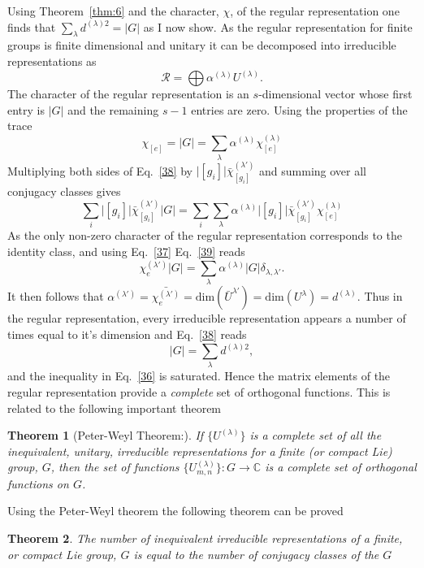 \documentclass{article}
\newcommand\defn[1]{\textsl{#1}}
\newcommand\cR{{\mathcal R}}
\newtheorem{theorem}{Theorem}
\begin{document}
Using Theorem~\ref{thm:6} and the character, $\chi$, of the regular representation one finds that $\sum_\lambda d^{(\lambda)2}=\lvert G\rvert$ as I now show.  As the regular representation for finite groups is finite dimensional and unitary it can be decomposed into irreducible representations as 
\begin{equation}
\cR=\bigoplus \alpha^{(\lambda)} U^{(\lambda)}.
\label{37}
\end{equation}
The character of the regular representation is an $s$-dimensional vector whose first entry is $\lvert G\rvert$ and the remaining $s-1$ entries are zero.  Using the properties of the trace 
\begin{equation}
\chi_{[e]}=\lvert G\rvert=\sum_\lambda \alpha^{(\lambda)} \chi^{(\lambda)}_{[e]}
\label{38}
\end{equation}
Multiplying both sides of Eq.~\eqref{38} by $\lvert[g_i]\rvert\bar{\chi}^{(\lambda')}_{[g_i]}$ and summing over all conjugacy classes  gives
\begin{equation}
\sum_i\lvert[g_i]\rvert\bar{\chi}^{(\lambda')}_{[g_i]}\lvert G\rvert=\sum_i\sum_\lambda\alpha^{(\lambda)}\rvert[g_i]\lvert\bar{\chi}^{(\lambda')}_{[g_i]}\chi^{(\lambda)}_{[e]}
\label{39}
\end{equation}
As the only non-zero character of the regular representation corresponds to the identity class, and using Eq.~\eqref{37} Eq.~\eqref{39} reads
\begin{equation}
{\chi}^{(\lambda')}_{e}\lvert G\rvert=\sum_\lambda\alpha^{(\lambda)}\lvert G\rvert\delta_{\lambda,\lambda'}.
\label{40}
\end{equation}
It then follows that $\alpha^{(\lambda')}=\bar{\chi^{(\lambda')}_{e}}=\mathrm{dim}(\bar{U}^{\lambda'})=\mathrm{dim}(U^{\lambda})=d^{(\lambda)}$.  Thus in the regular representation, every irreducible representation appears a number of times equal to it's dimension and Eq.~\eqref{38} reads
\begin{equation}
\lvert G\rvert=\sum_\lambda d^{(\lambda)2},
\label{41}
\end{equation}
and the inequality in Eq.~\eqref{36} is saturated.  Hence the matrix elements of the regular representation provide a \defn{complete} set of orthogonal functions.  This is related to the following important theorem
\begin{theorem}[Peter-Weyl Theorem:]  If $\{U^{(\lambda)}\}$ is a complete set of all the inequivalent, unitary, irreducible representations for a finite (or compact Lie) group, $G$, then the set of functions $\{U^{(\lambda)}_{m,n}\}: G\rightarrow \mathbb{C}$ is a complete set of orthogonal functions on $G$.
\label{thm:7}
\end{theorem}
Using the Peter-Weyl theorem the following theorem can be proved
\begin{theorem}
The number of inequivalent irreducible representations of a finite, or compact Lie group, $G$ is equal to the number of conjugacy classes of the $G$
\label{thm:8}
\end{theorem}
\end{document}
